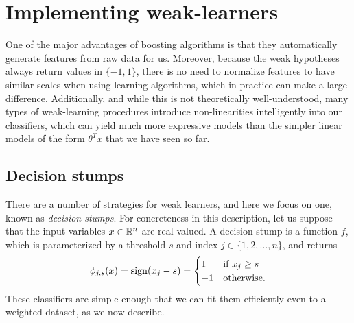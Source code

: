 \documentclass{article}
\newcommand{\represent}{\phi}
\begin{document}
\section{Implementing weak-learners}

One of the major advantages of boosting algorithms is that they
automatically generate features from raw data for us. Moreover, because the
weak hypotheses always return values in $\{-1, 1\}$, there is no need to
normalize features to have similar scales when using learning algorithms,
which in practice can make a large difference.  Additionally, and while this
is not theoretically well-understood, many types of weak-learning procedures
introduce non-linearities intelligently into our classifiers, which can
yield much more expressive models than the simpler linear models of the form
$\theta^T x$ that we have seen so far.

\subsection{Decision stumps}

There are a number of strategies for weak learners, and here
we focus on one, known as \emph{decision stumps}. For concreteness in this
description, let us suppose that the input variables $x \in \mathbb{R}^n$
are real-valued. A decision stump is a function $f$, which is parameterized
by a threshold $s$ and index $j \in \{1, 2, \ldots, n\}$, and returns
\begin{equation}
  \label{eqn:stumpy}
  \represent_{j,s}(x) = \sign(x_j - s)
  = \begin{cases} 1 & \mbox{if~} x_j \ge s \\ -1 & \mbox{otherwise}.
  \end{cases}
\end{equation}
These classifiers are simple enough that we can fit them efficiently
even to a weighted dataset, as we now describe.

\newcommand{\what}[1]{\widehat{#1}}
\end{document}
